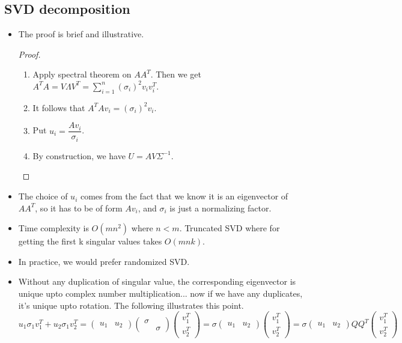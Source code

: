 \documentclass[11pt,reqno]{amsart}
\theoremstyle{remark}
\begin{document}
\subsection{SVD decomposition}
\begin{itemize}
\item The proof is brief and illustrative.
\begin{proof}
\begin{enumerate}
\item Apply spectral theorem on $AA^T$. Then we get $A^T A=V\Lambda V^T
=\sum\limits^n_{i=1}(\sigma_i)^2v_iv_i^T$.
\item It follows that $A^T Av_i=(\sigma_i)^2v_i$.
\item Put $u_i=\dfrac{Av_i}{\sigma_i}$.
\item By construction, we have $U=AV\Sigma^{-1}$.
\end{enumerate}
\end{proof}
\item The choice of $u_i$ comes from the fact that we know it is an 
eigenvector of $AA^T$, so it has to be of form $Av_i$, and $\sigma_i$ is just 
a normalizing factor.
\item Time complexity is $O(mn^2)$ where $n<m$. Truncated SVD where 
for getting the first k singular values takes $O(mnk)$.
\item In practice, we would prefer randomized SVD.
\item Without any duplication of singular value, the corresponding eigenvector is unique upto complex number multiplication... now if
we have any duplicates, it's unique upto rotation. The following illustrates this point.
$$
u_1 \sigma_1 v_1^T+ u_2\sigma_1 v_2^T=
\begin{pmatrix}
u_1 & u_2
\end{pmatrix}
\begin{pmatrix}
\sigma &  \\
 & \sigma
\end{pmatrix}
\begin{pmatrix}
v_1^T \\
v_2^T
\end{pmatrix}
=\sigma 
\begin{pmatrix}
u_1 & u_2
\end{pmatrix}
\begin{pmatrix}
v_1^T \\
v_2^T
\end{pmatrix}
=\sigma 
\begin{pmatrix}
u_1 & u_2
\end{pmatrix}
QQ^T
\begin{pmatrix}
v_1^T \\
v_2^T
\end{pmatrix}
$$
\end{itemize}
\end{document}
